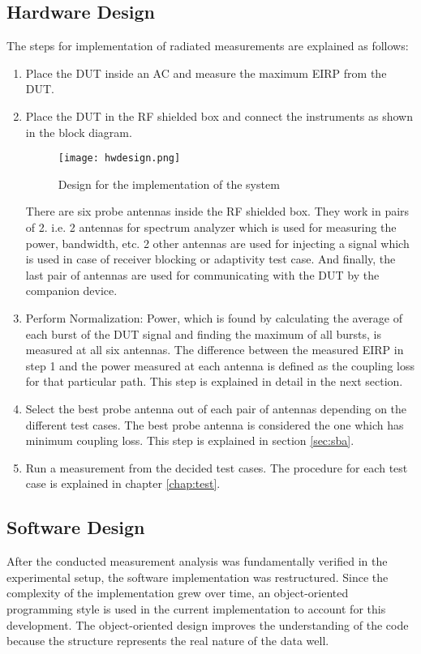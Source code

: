 \subsection{Hardware Design}
The steps for implementation of radiated measurements are explained as follows:
\begin{enumerate}
  \item Place the \acs{DUT} inside an \acf{AC} and measure the maximum \acs{EIRP} from the \acs{DUT}.
  \item Place the \acs{DUT} in the \acs{RF} shielded box and connect the instruments as shown in the block diagram.

\begin{figure}[H]
\centering
\texttt{[image: hwdesign.png]}
\caption{Design for the implementation of the system}
\label{fig:3} 
\end{figure}

There are six probe antennas inside the \acs{RF} shielded box. They work in pairs of 2. i.e. 2 antennas for spectrum analyzer which is used for measuring the power, bandwidth, etc. 2 other antennas are used for injecting a signal which is used in case of receiver blocking or adaptivity test case. And finally, the last pair of antennas are used for communicating with the \acs{DUT} by the companion device.

\item Perform Normalization: Power, which is found by calculating the average of each burst of the \acs{DUT} signal and finding the maximum of all bursts, is measured at all six antennas. The difference between the measured \acs{EIRP} in step 1 and the power measured at each antenna is defined as the coupling loss for that particular path. This step is explained in detail in the next section.

\item Select the best probe antenna out of each pair of antennas depending on the different test cases. The best probe antenna is considered the one which has minimum coupling loss. This step is explained in section \ref{sec:sba}. 

\item Run a measurement from the decided test cases. The procedure for each test case is explained in chapter \ref{chap:test}.

\end{enumerate}



\subsection{Software Design}
After the conducted measurement analysis was fundamentally verified in the experimental setup, the software implementation was restructured. Since the complexity of the implementation grew over time, an object-oriented programming style is used in the current implementation to account for this development. The object-oriented design improves the understanding of the code because the structure represents the real nature of the data well.

